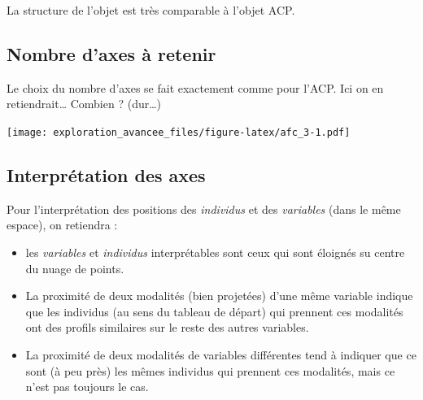 \documentclass[]{book}
\newenvironment{Shaded}{\begin{snugshade}}{\end{snugshade}}
\newcommand{\DataTypeTok}[1]{\textcolor[rgb]{0.13,0.29,0.53}{#1}}
\newcommand{\DecValTok}[1]{\textcolor[rgb]{0.00,0.00,0.81}{#1}}
\newcommand{\KeywordTok}[1]{\textcolor[rgb]{0.13,0.29,0.53}{\textbf{#1}}}
\newcommand{\NormalTok}[1]{#1}
\newcommand{\OperatorTok}[1]{\textcolor[rgb]{0.81,0.36,0.00}{\textbf{#1}}}
\newcommand{\StringTok}[1]{\textcolor[rgb]{0.31,0.60,0.02}{#1}}
\providecommand{\tightlist}{%
  \setlength{\itemsep}{0pt}\setlength{\parskip}{0pt}}
\begin{document}
La structure de l'objet est très comparable à l'objet ACP.

\hypertarget{nombre-daxes-a-retenir-1}{%
\subsection{Nombre d'axes à retenir}\label{nombre-daxes-a-retenir-1}}

Le choix du nombre d'axes se fait exactement comme pour l'ACP. Ici on en retiendrait\ldots{} Combien ? (dur\ldots{})

\begin{Shaded}
\end{Shaded}

\texttt{[image: exploration\_avancee\_files/figure-latex/afc\_3-1.pdf]}

\hypertarget{interpretation-des-axes}{%
\subsection{Interprétation des axes}\label{interpretation-des-axes}}

Pour l'interprétation des positions des \emph{individus} et des \emph{variables} (dans le même espace), on retiendra :

\begin{itemize}
\tightlist
\item
  les \emph{variables} et \emph{individus} interprétables sont ceux qui sont éloignés su centre du nuage de points.
\item
  La proximité de deux modalités (bien projetées) d'une même variable indique que les individus (au sens du tableau de départ) qui prennent ces modalités ont des profils similaires sur le reste des autres variables.
\item
  La proximité de deux modalités de variables différentes tend à indiquer que ce sont (à peu près) les mêmes individus qui prennent ces modalités, mais ce n'est pas toujours le cas.
\end{itemize}
\end{document}
